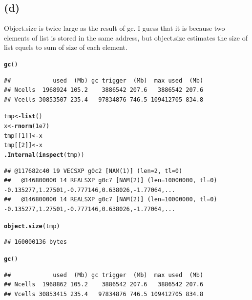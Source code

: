 \documentclass{article}\usepackage[]{graphicx}\usepackage[]{color}
\makeatletter
\newcommand{\hlnum}[1]{\textcolor[rgb]{0.686,0.059,0.569}{#1}}%
\newcommand{\hlstd}[1]{\textcolor[rgb]{0.345,0.345,0.345}{#1}}%
\newcommand{\hlkwb}[1]{\textcolor[rgb]{0.69,0.353,0.396}{#1}}%
\newcommand{\hlkwd}[1]{\textcolor[rgb]{0.737,0.353,0.396}{\textbf{#1}}}%
\newenvironment{kframe}{%
 \def\at@end@of@kframe{}%
 \ifinner\ifhmode%
  \def\at@end@of@kframe{\end{minipage}}%
  \begin{minipage}{\columnwidth}%
 \fi\fi%
 \def\FrameCommand##1{\hskip\@totalleftmargin \hskip-\fboxsep
 \colorbox{shadecolor}{##1}\hskip-\fboxsep
     \hskip-\linewidth \hskip-\@totalleftmargin \hskip\columnwidth}%
 \MakeFramed {\advance\hsize-\width
   \@totalleftmargin\z@ \linewidth\hsize
   \@setminipage}}%
 {\par\unskip\endMakeFramed%
 \at@end@of@kframe}
\newenvironment{knitrout}{}{} %
\makeatother
\begin{document}
\subsection{(d)}
Object.size is twice large as the result of gc. I guess that it is because two elements of list is stored in the same address, but object.size estimates the size of list equels to sum of size of each element.
\begin{knitrout}
\color{fgcolor}\begin{kframe}
\begin{alltt}
\hlkwd{gc}\hlstd{()}
\end{alltt}
\begin{verbatim}
##            used  (Mb) gc trigger  (Mb)  max used  (Mb)
## Ncells  1968924 105.2    3886542 207.6   3886542 207.6
## Vcells 30853507 235.4   97834876 746.5 109412705 834.8
\end{verbatim}
\begin{alltt}
\hlstd{tmp} \hlkwb{<-} \hlkwd{list}\hlstd{()}
\hlstd{x} \hlkwb{<-} \hlkwd{rnorm}\hlstd{(}\hlnum{1e7}\hlstd{)}
\hlstd{tmp[[}\hlnum{1}\hlstd{]]} \hlkwb{<-} \hlstd{x}
\hlstd{tmp[[}\hlnum{2}\hlstd{]]} \hlkwb{<-} \hlstd{x}
\hlkwd{.Internal}\hlstd{(}\hlkwd{inspect}\hlstd{(tmp))}
\end{alltt}
\begin{verbatim}
## @117682c40 19 VECSXP g0c2 [NAM(1)] (len=2, tl=0)
##   @146800000 14 REALSXP g0c7 [NAM(2)] (len=10000000, tl=0) -0.135277,1.27501,-0.777146,0.638026,-1.77064,...
##   @146800000 14 REALSXP g0c7 [NAM(2)] (len=10000000, tl=0) -0.135277,1.27501,-0.777146,0.638026,-1.77064,...
\end{verbatim}
\begin{alltt}
\hlkwd{object.size}\hlstd{(tmp)}
\end{alltt}
\begin{verbatim}
## 160000136 bytes
\end{verbatim}
\begin{alltt}
\hlkwd{gc}\hlstd{()}
\end{alltt}
\begin{verbatim}
##            used  (Mb) gc trigger  (Mb)  max used  (Mb)
## Ncells  1968862 105.2    3886542 207.6   3886542 207.6
## Vcells 30853415 235.4   97834876 746.5 109412705 834.8
\end{verbatim}
\end{kframe}
\end{knitrout}
\end{document}
